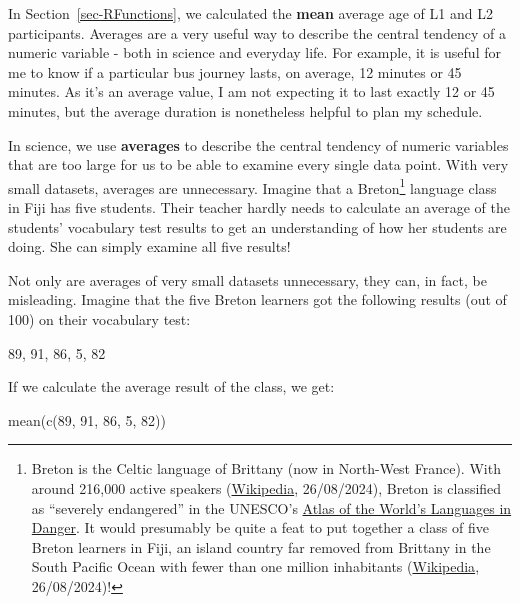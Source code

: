 \documentclass[
  letterpaper,
  DIV=11,
  numbers=noendperiod]{scrreprt}
\newenvironment{Shaded}{\begin{snugshade}}{\end{snugshade}}
\newcommand{\DecValTok}[1]{\textcolor[rgb]{0.68,0.00,0.00}{#1}}
\newcommand{\FunctionTok}[1]{\textcolor[rgb]{0.28,0.35,0.67}{#1}}
\newcommand{\NormalTok}[1]{\textcolor[rgb]{0.00,0.23,0.31}{#1}}
\newcounter{none} %
\begin{document}
In Section~\ref{sec-RFunctions}, we calculated the \textbf{mean} average
age of L1 and L2 participants. Averages are a very useful way to
describe the central tendency of a numeric variable - both in science
and everyday life. For example, it is useful for me to know if a
particular bus journey lasts, on average, 12 minutes or 45 minutes. As
it's an average value, I am not expecting it to last exactly 12 or 45
minutes, but the average duration is nonetheless helpful to plan my
schedule.

In science, we use \textbf{averages} to describe the central tendency of
numeric variables that are too large for us to be able to examine every
single data point. With very small datasets, averages are unnecessary.
Imagine that a Breton\footnote{Breton is the Celtic language of Brittany
  (now in North-West France). With around 216,000 active speakers
  (\href{https://en.wikipedia.org/wiki/Breton_language}{Wikipedia},
  26/08/2024), Breton is classified as ``severely endangered'' in the
  UNESCO's
  \href{https://en.wikipedia.org/wiki/Atlas_of_the_World\%27s_Languages_in_Danger}{Atlas
  of the World's Languages in Danger}. It would presumably be quite a
  feat to put together a class of five Breton learners in Fiji, an
  island country far removed from Brittany in the South Pacific Ocean
  with fewer than one million inhabitants
  (\href{https://en.wikipedia.org/wiki/Fiji}{Wikipedia}, 26/08/2024)!}
language class in Fiji has five students. Their teacher hardly needs to
calculate an average of the students' vocabulary test results to get an
understanding of how her students are doing. She can simply examine all
five results!

Not only are averages of very small datasets unnecessary, they can, in
fact, be misleading. Imagine that the five Breton learners got the
following results (out of 100) on their vocabulary test:

\begin{Shaded}
\begin{Highlighting}[]
\DecValTok{89}\NormalTok{, }\DecValTok{91}\NormalTok{, }\DecValTok{86}\NormalTok{, }\DecValTok{5}\NormalTok{, }\DecValTok{82}
\end{Highlighting}
\end{Shaded}

If we calculate the average result of the class, we get:

\begin{Shaded}
\begin{Highlighting}[]
\FunctionTok{mean}\NormalTok{(}\FunctionTok{c}\NormalTok{(}\DecValTok{89}\NormalTok{, }\DecValTok{91}\NormalTok{, }\DecValTok{86}\NormalTok{, }\DecValTok{5}\NormalTok{, }\DecValTok{82}\NormalTok{))}
\end{Highlighting}
\end{Shaded}
\end{document}
